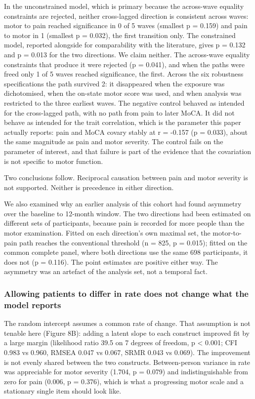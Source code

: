 \documentclass[
  english,
  12pt,
]{article}
\begin{document}
In the unconstrained model, which is primary because the across-wave equality constraints are rejected, neither cross-lagged direction is consistent across waves: motor to pain reached significance in 0 of 5 waves (smallest p = 0.159) and pain to motor in 1 (smallest p = 0.032), the first transition only. The constrained model, reported alongside for comparability with the literature, gives p = 0.132 and p = 0.013 for the two directions. We claim neither. The across-wave equality constraints that produce it were rejected (p = 0.041), and when the paths were freed only 1 of 5 waves reached significance, the first. Across the six robustness specifications the path survived 2: it disappeared when the exposure was dichotomised, when the on-state motor score was used, and when analysis was restricted to the three earliest waves. The negative control behaved as intended for the cross-lagged path, with no path from pain to later MoCA. It did not behave as intended for the trait correlation, which is the parameter this paper actually reports: pain and MoCA covary stably at r = -0.157 (p = 0.033), about the same magnitude as pain and motor severity. The control fails on the parameter of interest, and that failure is part of the evidence that the covariation is not specific to motor function.

Two conclusions follow. Reciprocal causation between pain and motor severity is not supported. Neither is precedence in either direction.

We also examined why an earlier analysis of this cohort had found asymmetry over the baseline to 12-month window. The two directions had been estimated on different sets of participants, because pain is recorded for more people than the motor examination. Fitted on each direction's own maximal set, the motor-to-pain path reaches the conventional threshold (n = 825, p = 0.015); fitted on the common complete panel, where both directions use the same 698 participants, it does not (p = 0.116). The point estimates are positive either way. The asymmetry was an artefact of the analysis set, not a temporal fact.

\subsubsection{Allowing patients to differ in rate does not change what the model reports}\label{allowing-patients-to-differ-in-rate-does-not-change-what-the-model-reports}

The random intercept assumes a common rate of change. That assumption is not tenable here (Figure 8B): adding a latent slope to each construct improved fit by a large margin (likelihood ratio 39.5 on 7 degrees of freedom, p \textless{} 0.001; CFI 0.983 vs 0.960, RMSEA 0.047 vs 0.067, SRMR 0.043 vs 0.069). The improvement is not evenly shared between the two constructs. Between-person variance in rate was appreciable for motor severity (1.704, p = 0.079) and indistinguishable from zero for pain (0.006, p = 0.376), which is what a progressing motor scale and a stationary single item should look like.
\end{document}
